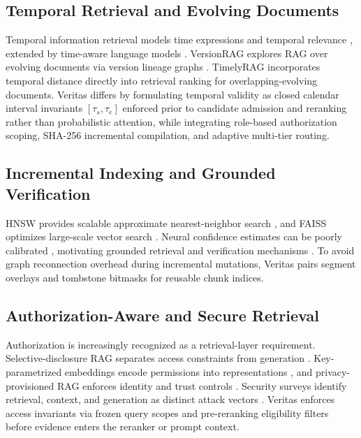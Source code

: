 \documentclass[journal]{IEEEtran}
\newcommand{\sys}{Veritas}
\begin{document}
\subsection{Temporal Retrieval and Evolving Documents}
Temporal information retrieval models time expressions and temporal relevance \cite{campos2014temporal}, extended by time-aware language models \cite{dhingra2022time}. VersionRAG explores RAG over evolving documents via version lineage graphs \cite{huwiler2025versionrag}. TimelyRAG \cite{timelyrag2026} incorporates temporal distance directly into retrieval ranking for overlapping-evolving documents. \sys{} differs by formulating temporal validity as closed calendar interval invariants $[\tau_s, \tau_e]$ enforced prior to candidate admission and reranking rather than probabilistic attention, while integrating role-based authorization scoping, SHA-256 incremental compilation, and adaptive multi-tier routing.

\subsection{Incremental Indexing and Grounded Verification}
HNSW provides scalable approximate nearest-neighbor search \cite{malkov2020hnsw}, and FAISS optimizes large-scale vector search \cite{johnson2021faiss}. Neural confidence estimates can be poorly calibrated \cite{guo2017calibration}, motivating grounded retrieval and verification mechanisms \cite{asai2024selfrag}. To avoid graph reconnection overhead during incremental mutations, \sys{} pairs segment overlays and tombstone bitmasks for reusable chunk indices.

\subsection{Authorization-Aware and Secure Retrieval}
Authorization is increasingly recognized as a retrieval-layer requirement. Selective-disclosure RAG separates access constraints from generation \cite{almasoud2026sdrag}. Key-parametrized embeddings encode permissions into representations \cite{thuillier2026access}, and privacy-provisioned RAG enforces identity and trust controls \cite{saxena2026ppparitl}. Security surveys identify retrieval, context, and generation as distinct attack vectors \cite{mu2026securerag,palanisamy2026security}. \sys{} enforces access invariants via frozen query scopes and pre-reranking eligibility filters before evidence enters the reranker or prompt context.
\end{document}
